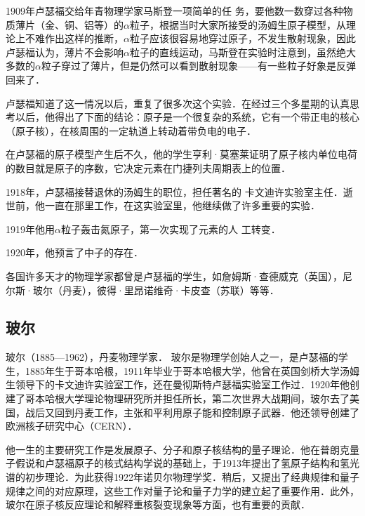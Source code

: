 1909年卢瑟福交给年青物理学家马斯登一项简单的任
务，要他数一数穿过各种物质薄片（金、铜、铝等）的$\alpha$粒子，根据当时大家所接受的汤姆生原子模型，从理论上不难作出这样的推断，$\alpha$粒子应该很容易地穿过原子，不发生散射现象，因此卢瑟福认为，薄片不会影响$\alpha$粒子的直线运动，马斯登在实验时注意到，虽然绝大多数的$\alpha$粒子穿过了薄片，但是仍然可以看到散射现象——有一些粒子好象是反弹回来了．

卢瑟福知道了这一情况以后，重复了很多次这个实验．在经过三个多星期的认真思考以后，他得出了下面的结论：原子是一个很复杂的系统，它有一个带正电的核心（原子核），在核周围的一定轨道上转动着带负电的电子．

在卢瑟福的原子模型产生后不久，他的学生亨利·莫塞莱证明了原子核内单位电荷的数目就是原子的序数，它决定元素在门捷列夫周期表上的位置．

1918年，卢瑟福接替退休的汤姆生的职位，担任著名的
卡文迪许实验室主任．逝世前，他一直在那里工作，在这实验室里，他继续做了许多重要的实验．

1919年他用$\alpha$粒子轰击氮原子，第一次实现了元素的人
工转变．

1920年，他预言了中子的存在．

各国许多天才的物理学家都曾是卢瑟福的学生，如詹姆斯·查德威克（英国），尼尔斯·玻尔（丹麦），彼得·里昂诺维奇·卡皮查（苏联）等等．

\subsection{玻尔}
玻尔（1885—1962），丹麦物理学家．
玻尔是物理学创始人之一，是卢瑟福的学生，1885年生于哥本哈根，1911年毕业于哥本哈根大学，他曾在英国剑桥大学汤姆生领导下的卡文迪许实验室工作，还在曼彻斯特卢瑟福实验室工作过．1920年他创建了哥本哈根大学理论物理研究所并担任所长，第二次世界大战期间，玻尔去了美国，战后又回到丹麦工作，主张和平利用原子能和控制原子武器．他还领导创建了欧洲核子研究中心（CERN）．

他一生的主要研究工作是发展原子、分子和原子核结构的量子理论．他在普朗克量子假说和卢瑟福原子的核式结构学说的基础上，于1913年提出了氢原子结构和氢光谱的初步理论．为此获得1922年诺贝尔物理学奖．稍后，又提出了经典规律和量子规律之间的对应原理，这些工作对量子论和量子力学的建立起了重要作用．此外，玻尔在原子核反应理论和解释重核裂变现象等方面，也有重要的贡献．





